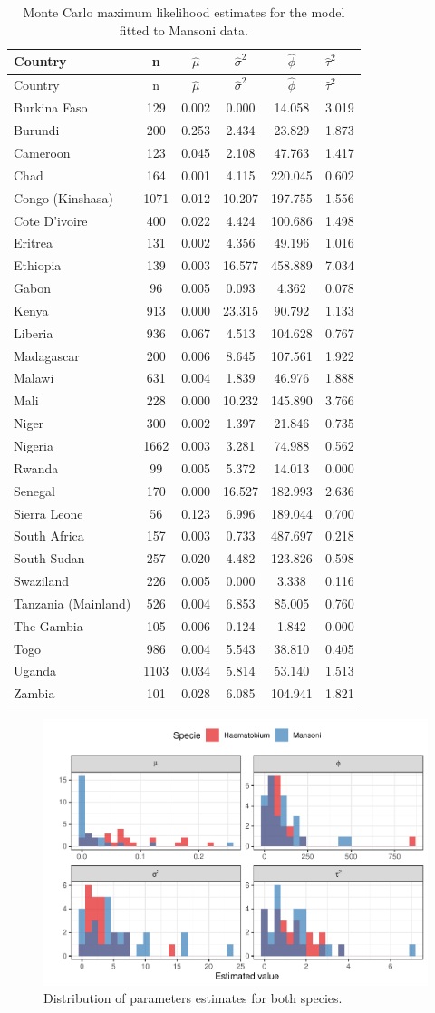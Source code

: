 \documentclass[11pt,]{article}
\begin{document}
\begin{longtable}[]{@{}lccccl@{}}
\caption{\label{tab:mansoni} Monte Carlo maximum likelihood estimates
for the model fitted to Mansoni data.}\tabularnewline
\toprule
Country & n & \(\hat{\mu}\) & \(\hat{\sigma}^2\) & \(\hat{\phi}\) &
\(\hat{\tau}^2\)\tabularnewline
\midrule
\endfirsthead
\toprule
Country & n & \(\hat{\mu}\) & \(\hat{\sigma}^2\) & \(\hat{\phi}\) &
\(\hat{\tau}^2\)\tabularnewline
\midrule
\endhead
Burkina Faso & 129 & 0.002 & 0.000 & 14.058 & 3.019\tabularnewline
Burundi & 200 & 0.253 & 2.434 & 23.829 & 1.873\tabularnewline
Cameroon & 123 & 0.045 & 2.108 & 47.763 & 1.417\tabularnewline
Chad & 164 & 0.001 & 4.115 & 220.045 & 0.602\tabularnewline
Congo (Kinshasa) & 1071 & 0.012 & 10.207 & 197.755 &
1.556\tabularnewline
Cote D'ivoire & 400 & 0.022 & 4.424 & 100.686 & 1.498\tabularnewline
Eritrea & 131 & 0.002 & 4.356 & 49.196 & 1.016\tabularnewline
Ethiopia & 139 & 0.003 & 16.577 & 458.889 & 7.034\tabularnewline
Gabon & 96 & 0.005 & 0.093 & 4.362 & 0.078\tabularnewline
Kenya & 913 & 0.000 & 23.315 & 90.792 & 1.133\tabularnewline
Liberia & 936 & 0.067 & 4.513 & 104.628 & 0.767\tabularnewline
Madagascar & 200 & 0.006 & 8.645 & 107.561 & 1.922\tabularnewline
Malawi & 631 & 0.004 & 1.839 & 46.976 & 1.888\tabularnewline
Mali & 228 & 0.000 & 10.232 & 145.890 & 3.766\tabularnewline
Niger & 300 & 0.002 & 1.397 & 21.846 & 0.735\tabularnewline
Nigeria & 1662 & 0.003 & 3.281 & 74.988 & 0.562\tabularnewline
Rwanda & 99 & 0.005 & 5.372 & 14.013 & 0.000\tabularnewline
Senegal & 170 & 0.000 & 16.527 & 182.993 & 2.636\tabularnewline
Sierra Leone & 56 & 0.123 & 6.996 & 189.044 & 0.700\tabularnewline
South Africa & 157 & 0.003 & 0.733 & 487.697 & 0.218\tabularnewline
South Sudan & 257 & 0.020 & 4.482 & 123.826 & 0.598\tabularnewline
Swaziland & 226 & 0.005 & 0.000 & 3.338 & 0.116\tabularnewline
Tanzania (Mainland) & 526 & 0.004 & 6.853 & 85.005 &
0.760\tabularnewline
The Gambia & 105 & 0.006 & 0.124 & 1.842 & 0.000\tabularnewline
Togo & 986 & 0.004 & 5.543 & 38.810 & 0.405\tabularnewline
Uganda & 1103 & 0.034 & 5.814 & 53.140 & 1.513\tabularnewline
Zambia & 101 & 0.028 & 6.085 & 104.941 & 1.821\tabularnewline
\bottomrule
\end{longtable}

\begin{figure}

{\centering \includegraphics[width=1\linewidth]{skeleton_files/figure-latex/plots-1} 

}

\caption{Distribution of parameters estimates for both species.}\label{fig:plots}
\end{figure}




\newpage
\singlespacing 

\end{document}
